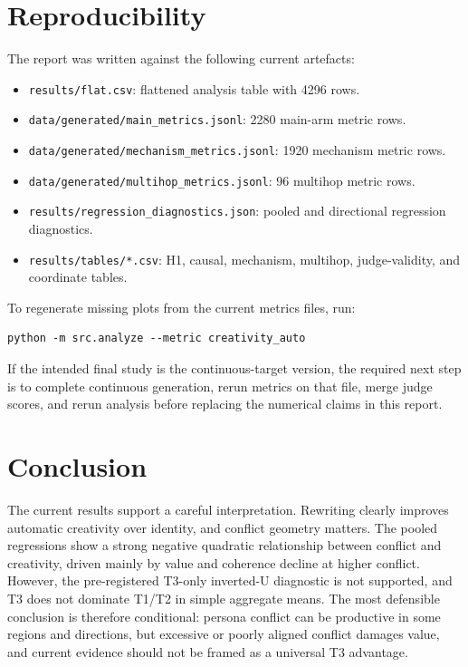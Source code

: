\documentclass[sigconf,nonacm]{acmart}
\begin{document}
\section{Reproducibility}

The report was written against the following current artefacts:
\begin{itemize}\itemsep2pt
\item \texttt{results/flat.csv}: flattened analysis table with 4296 rows.
\item \texttt{data/generated/main\_metrics.jsonl}: 2280 main-arm metric rows.
\item \texttt{data/generated/mechanism\_metrics.jsonl}: 1920 mechanism metric rows.
\item \texttt{data/generated/multihop\_metrics.jsonl}: 96 multihop metric rows.
\item \texttt{results/regression\_diagnostics.json}: pooled and directional regression diagnostics.
\item \texttt{results/tables/*.csv}: H1, causal, mechanism, multihop, judge-validity, and coordinate tables.
\end{itemize}

To regenerate missing plots from the current metrics files, run:
\begin{verbatim}
python -m src.analyze --metric creativity_auto
\end{verbatim}
If the intended final study is the continuous-target version, the required next step is to complete continuous generation, rerun metrics on that file, merge judge scores, and rerun analysis before replacing the numerical claims in this report.

\section{Conclusion}

The current results support a careful interpretation.
Rewriting clearly improves automatic creativity over identity, and conflict geometry matters.
The pooled regressions show a strong negative quadratic relationship between conflict and creativity, driven mainly by value and coherence decline at higher conflict.
However, the pre-registered T3-only inverted-U diagnostic is not supported, and T3 does not dominate T1/T2 in simple aggregate means.
The most defensible conclusion is therefore conditional: persona conflict can be productive in some regions and directions, but excessive or poorly aligned conflict damages value, and current evidence should not be framed as a universal T3 advantage.
\end{document}
